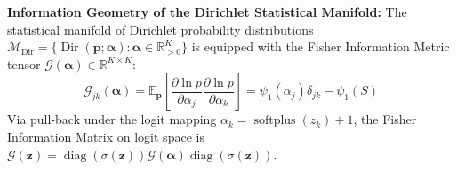 \documentclass[3p,12pt]{elsarticle}
\theoremstyle{plain}
\theoremstyle{definition}
\begin{document}
\noindent \textbf{Information Geometry of the Dirichlet Statistical Manifold:} The statistical manifold of Dirichlet probability distributions $\mathcal{M}_{\text{Dir}} = \{\operatorname{Dir}(\mathbf{p}; \boldsymbol{\alpha}) : \boldsymbol{\alpha} \in \mathbb{R}_{>0}^K\}$ is equipped with the Fisher Information Metric tensor $\mathcal{G}(\boldsymbol{\alpha}) \in \mathbb{R}^{K \times K}$:
\begin{equation}
    \mathcal{G}_{jk}(\boldsymbol{\alpha}) = \mathbb{E}_{\mathbf{p}}\left[ \frac{\partial \ln p}{\partial \alpha_j} \frac{\partial \ln p}{\partial \alpha_k} \right] = \psi_1(\alpha_j) \delta_{jk} - \psi_1(S)
\end{equation}
Via pull-back under the logit mapping $\alpha_k = \operatorname{softplus}(z_k) + 1$, the Fisher Information Matrix on logit space is $\mathcal{G}(\mathbf{z}) = \operatorname{diag}(\sigma(\mathbf{z})) \mathcal{G}(\boldsymbol{\alpha}) \operatorname{diag}(\sigma(\mathbf{z}))$.
\end{document}
